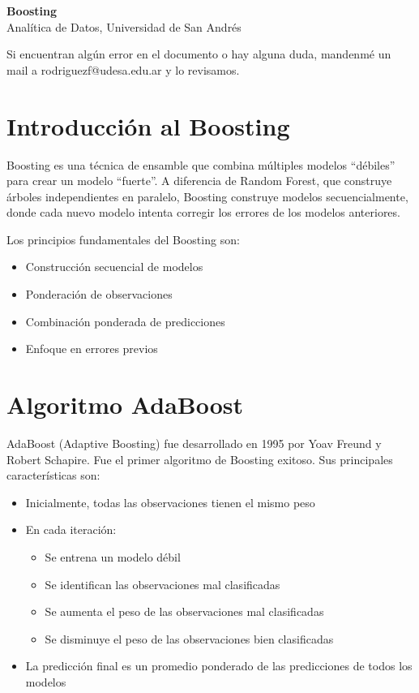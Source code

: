 \documentclass[12pt]{article}
\begin{document}
\begin{center}
  {\LARGE \textbf{Boosting}}\\[0.5em]
  {Analítica de Datos, Universidad de San Andrés}
\end{center}

Si encuentran algún error en el documento o hay alguna duda, mandenmé un mail a rodriguezf@udesa.edu.ar y lo revisamos.

\section{Introducción al Boosting}
Boosting es una técnica de ensamble que combina múltiples modelos ``débiles'' para crear un modelo ``fuerte''. A diferencia de Random Forest, que construye árboles independientes en paralelo, Boosting construye modelos secuencialmente, donde cada nuevo modelo intenta corregir los errores de los modelos anteriores.

\vspace{1em}

Los principios fundamentales del Boosting son:
\begin{itemize}
    \item Construcción secuencial de modelos
    \item Ponderación de observaciones
    \item Combinación ponderada de predicciones
    \item Enfoque en errores previos
\end{itemize}

\section{Algoritmo AdaBoost}
AdaBoost (Adaptive Boosting) fue desarrollado en 1995 por Yoav Freund y Robert Schapire. Fue el primer algoritmo de Boosting exitoso. Sus principales características son:

\begin{itemize}
    \item Inicialmente, todas las observaciones tienen el mismo peso
    \item En cada iteración:
    \begin{itemize}
        \item Se entrena un modelo débil
        \item Se identifican las observaciones mal clasificadas
        \item Se aumenta el peso de las observaciones mal clasificadas
        \item Se disminuye el peso de las observaciones bien clasificadas
    \end{itemize}
    \item La predicción final es un promedio ponderado de las predicciones de todos los modelos
\end{itemize}
\end{document}
